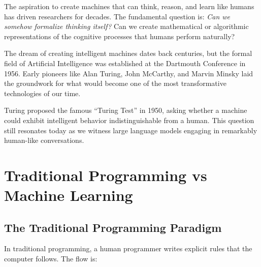 The aspiration to create machines that can think, reason, and learn like humans has driven researchers for decades. The fundamental question is: \textit{Can we somehow formalize thinking itself?} Can we create mathematical or algorithmic representations of the cognitive processes that humans perform naturally?

\begin{bluebox}
The dream of creating intelligent machines dates back centuries, but the formal field of Artificial Intelligence was established at the Dartmouth Conference in 1956. Early pioneers like Alan Turing, John McCarthy, and Marvin Minsky laid the groundwork for what would become one of the most transformative technologies of our time.

Turing proposed the famous ``Turing Test'' in 1950, asking whether a machine could exhibit intelligent behavior indistinguishable from a human. This question still resonates today as we witness large language models engaging in remarkably human-like conversations.
\end{bluebox}


\section{Traditional Programming vs Machine Learning}

\subsection{The Traditional Programming Paradigm}

In traditional programming, a human programmer writes explicit rules that the computer follows. The flow is:

\begin{center}
\end{center}

